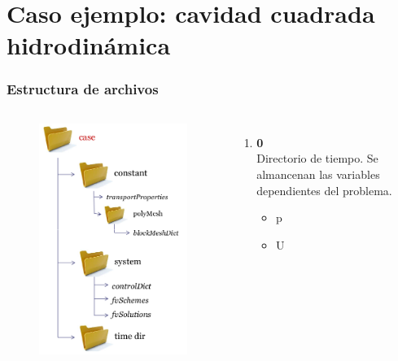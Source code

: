 \section{Caso ejemplo: cavidad cuadrada hidrodin\'amica}

\begin{frame}
    \frametitle{Estructura de archivos}

    \begin{columns}
        
        \begin{figure}
            \centering
            \includegraphics[scale=0.3]{Imagenes/file_structure_2}
        \end{figure}
        
        
        \footnotesize
        \begin{enumerate}
            \item {\bf 0} \\
                  Directorio de tiempo. Se almancenan las variables dependientes del problema.
            \begin{itemize}
                \tiny
                \item p
                \item U
            \end{itemize}
            

\end{enumerate}
\end{columns}
\end{frame}
